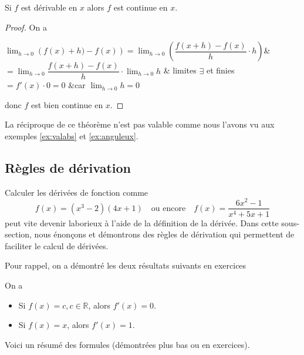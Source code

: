 \documentclass[a4paper,12pt]{article}
\begin{document}
\begin{thm}
		\tcblower
Si $f$ est dérivable en $x$ alors $f$ est continue en $x$.

\begin{proof}
	On a

	\begin{explanation}[0.75]
	$\displaystyle{\lim_{h\to0}\left( f(x)+h)-f(x)\right)}=\displaystyle{\lim_{h\to 0}\left(\dfrac{f(x+h)-f(x)}{h}\cdot h\right)}$&\\
	$=\displaystyle{\lim_{h\to 0}\dfrac{f(x+h)-f(x)}{h}\cdot\lim_{h\to 0}h} $ & limites $\exists$ et finies\\
			$=f'(x)\cdot 0=0$ &car $\displaystyle{\lim_{h\to 0}h=0}$
\end{explanation}
donc $f$ est bien continue en $x$.
\end{proof}
\end{thm}
\begin{remarque}
	\tcblower
	La réciproque de ce théorème n'est pas valable comme nous l'avons vu aux exemples \ref{ex:valabs} et \ref{ex:anguleux}.
\end{remarque}

\subsection{Règles de dérivation}
Calculer les dérivées de fonction comme
\[f(x)=(x^3-2)(4x+1)\quad \text{ou encore} \quad f(x)=\dfrac{6x^2-1}{x^4+5x+1}\]
peut vite devenir laborieux à l'aide de la définition de la dérivée. Dans cette sous-section, nous énonçons et démontrons des règles de dérivation qui permettent de faciliter le calcul de dérivées. 

Pour rappel, on a démontré les deux résultats suivants en exercices
\begin{prop}
		\tcblower	
	On a 
	\begin{itemize}
		\item Si $f(x)=c, c\in\mathbb{R}$, alors $f'(x)=0$. 
		\item Si $f(x)=x$, alors $f'(x)=1$. 
	\end{itemize}
\end{prop}

Voici un résumé des formules (démontrées plus bas ou en exercices). 
\end{document}
